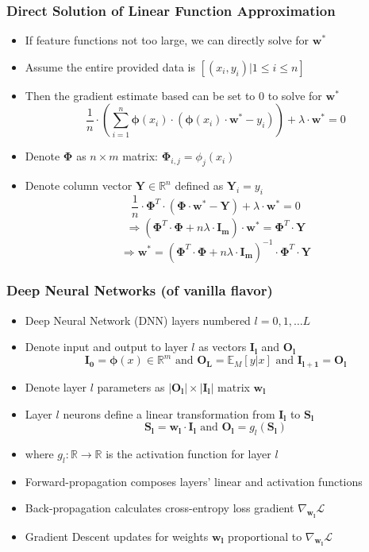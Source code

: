 \documentclass[handout]{beamer}
\begin{document}
\begin{frame}
\frametitle{Direct Solution of Linear Function Approximation}
\pause
\begin{itemize}[<+->]
\item If feature functions not too large, we can directly solve for $\bm{w^*}$ 
\item Assume the entire provided data is $[(x_i, y_i)|1\leq i \leq n]$
\item Then the gradient estimate based can be set to 0 to solve for $\bm{w^*}$
$$\frac 1 n \cdot (\sum_{i=1}^n \bm{\phi}(x_i) \cdot (\bm{\phi}(x_i) \cdot \bm{w^*} - y_i)) + \lambda \cdot \bm{w^*} = 0$$
\item Denote $\bm{\Phi}$ as $n \times m$ matrix: $\bm{\Phi}_{i,j} = \phi_j(x_i)$
\item Denote column vector $\bm{Y} \in \mathbb{R}^n$ defined as $\bm{Y}_i = y_i$
$$\frac 1 n \cdot \bm{\Phi}^T \cdot (\bm{\Phi} \cdot \bm{w^*} - \bm{Y}) + \lambda \cdot \bm{w^*} = 0$$
$$\Rightarrow (\bm{\Phi}^T \cdot \bm{\Phi} + n \lambda \cdot \bm{I_m}) \cdot \bm{w^*} = \bm{\Phi}^T \cdot \bm{Y}$$
$$\Rightarrow \bm{w^*} = (\bm{\Phi}^T \cdot \bm{\Phi} + n \lambda \cdot \bm{I_m})^{-1} \cdot \bm{\Phi}^T \cdot \bm{Y}$$
\end{itemize}
\end{frame}

\begin{frame}
\frametitle{Deep Neural Networks (of vanilla flavor)}
\pause
\begin{itemize}[<+->]
\item Deep Neural Network (DNN) layers numbered $l = 0, 1, \ldots L$
\item Denote input and output to layer $l$ as vectors $\bm{I_l}$ and $\bm{O_l}$
$$\bm{I_0} = \bm{\phi}(x) \in \mathbb{R}^m \text{ and } \bm{O_L} = \mathbb{E}_M[y|x] \text{ and } \bm{I_{l+1}} = \bm{O_l}$$
\item Denote layer $l$ parameters as $|\bm{O_l}| \times |\bm{I_l}|$ matrix $\bm{w_l}$
\item Layer $l$ neurons define a linear transformation from $\bm{I_l}$ to $\bm{S_l}$
$$\bm{S_l} = \bm{w_l} \cdot \bm{I_l} \text{ and } \bm{O_l} = g_l(\bm{S_l})$$
\item where $g_l: \mathbb{R} \rightarrow \mathbb{R}$ is the activation function for layer $l$
\item Forward-propagation composes layers' linear and activation functions
\item Back-propagation calculates cross-entropy loss gradient $\nabla_{\bm{w_l}} \mathcal{L}$
\item Gradient Descent updates for weights $\bm{w_l}$ proportional to $\nabla_{\bm{w_l}} \mathcal{L}$
\end{itemize}
\end{frame}
\end{document}
